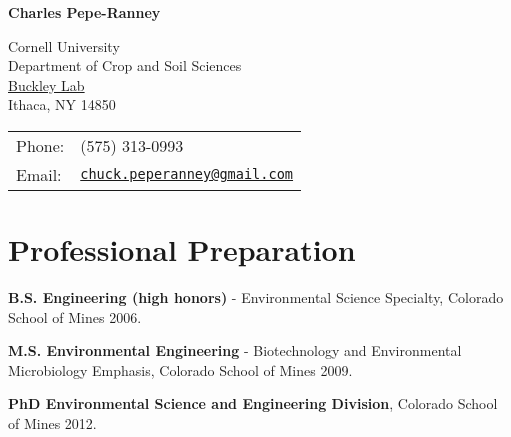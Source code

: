 \documentclass[letterpaper]{article}
\def\name{\textbf{Charles Pepe-Ranney}}
\renewenvironment{itemize}{
  \begin{list}{}{
    \setlength{\leftmargin}{1.5em}
  }
}{
  \end{list}
}
\begin{document}
{\Large \name}


\vspace{0.125in}

\begin{minipage}{0.45\linewidth}
  Cornell University \\
  Department of Crop and Soil Sciences \\
  \href{http://www.css.cornell.edu/faculty/buckley/}{Buckley Lab} \\
  Ithaca, NY 14850
\end{minipage}
\begin{minipage}{0.45\linewidth}
  \begin{tabular}{ll}
    Phone: & (575) 313-0993 \\
    Email: & \href{mailto:chuck.peperanney@gmail.com}{\tt chuck.peperanney@gmail.com} \\
  \end{tabular}
\end{minipage}
\section*{Professional Preparation}
\begin{itemize}
    \item \textbf{B.S. Engineering (high honors)} - Environmental Science Specialty, Colorado School of Mines 2006.
    \item \textbf{M.S. Environmental Engineering} - Biotechnology and Environmental Microbiology Emphasis, Colorado School of Mines 2009.
    \item \textbf{PhD Environmental Science and Engineering Division}, Colorado School of Mines 2012.
\end{itemize}
\end{document}
